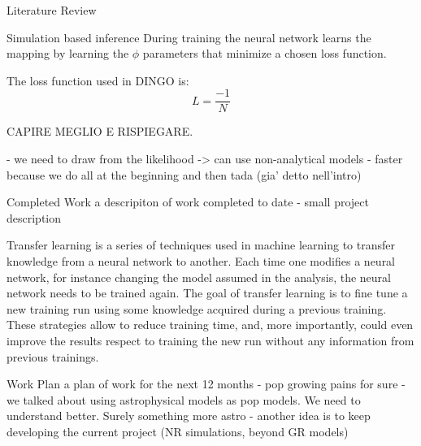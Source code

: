 \documentclass[a4paper, 12pt, twoside, openright, titlepage]{book}
\begin{document}
\begin{chapter}{Literature Review}
\begin{section}{Simulation based inference}
During training the neural network learns the mapping by learning the $\phi$ parameters that minimize a chosen loss function.

The loss function used in DINGO is:
\begin{equation}
L = \frac{-1}{N}
\end{equation}

CAPIRE MEGLIO E RISPIEGARE.








- we need to draw from the likelihood -> can use non-analytical models
- faster because we do all at the beginning and then tada (gia' detto nell'intro)



\end{section}















\end{chapter}

\begin{chapter}{Completed Work}
a descripiton of work completed to date
- small project description

Transfer learning is a series of techniques used in machine learning to transfer knowledge from a neural network to another.
Each time one modifies a neural network, for instance changing the model assumed in the analysis, the neural network needs to be trained again. 
The goal of transfer learning is to fine tune a new training run using some knowledge acquired during a previous training.
These strategies allow to reduce training time, and, more importantly, could even improve the results respect to training the new run without any information from previous trainings. 




\end{chapter}

\begin{chapter}{Work Plan}
a plan of work for the next 12 months
- pop growing pains for sure
- we talked about using astrophysical models as pop models. We need to understand better. Surely something more astro
- another idea is to keep developing the current project (NR simulations, beyond GR models)
\end{chapter}
\end{document}
